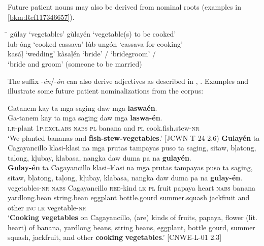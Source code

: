 Future patient nouns may also be derived from nominal roots (examples in \ref{bkm:Ref117346657}).

\ea
\label{bkm:Ref117346657}
\begin{tabbing}
\hspace{4cm} \= \kill
gúlay ‘vegetables’ \> gùlayén ‘vegetable(s) to be cooked’ \\
lub{}-óng ‘cooked cassava’ \> lùb{}-ungón ‘cassava for cooking’ \\
kasáļ ‘wedding’ \> kàsaļén ‘bride’ / ‘bridegroom’ / \\
\> ‘bride and groom’ (someone to be married)
\end{tabbing}
\z

The suffix -\textit{én}/-\textit{ón} can also derive adjectives as described in , . Examples  and  illustrate some future patient nominalizations from the corpus:

\ea
\label{bkm:Ref116398789}
Gatanem  kay  ta  mga  saging  daw  mga  \textbf{laswaén}. \\\smallskip
 \gll Ga-tanem  kay  ta  mga  saging  daw  mga  \textbf{laswa-én}. \\
\textsc{i.r}-plant  1\textsc{p.excl.abs}  \textsc{nabs}  \textsc{pl}  banana  and  \textsc{pl}  cook.fish.stew-\textsc{nr} \\
\glt ‘We planted bananas and \textbf{fish-stew-vegetables}.’ [JCWN-T-24 2.6)
\z
\ea
\label{bkm:Ref116398793}
\textbf{Gulayén}  ta  Cagayancillo  klasi-klasi  na  mga  prutas  tampayas puso  ta  saging,  sitaw,  bļatong,  taļong,  kļubay,  klabasa,  nangka  daw  duma  pa  na  \textbf{gulayén}. \\\smallskip
 \gll \textbf{Gulay-én}  ta  Cagayancillo  klasi--klasi  na  mga  prutas  tampayas puso  ta  saging,  sitaw,  bļatong,  taļong,  kļubay,  klabasa\footnotemark{},  nangka  daw  duma  pa  na  \textbf{gulay-én}. \\
vegetables-\textsc{nr}  \textsc{nabs}  Cagayancillo  \textsc{red}-kind  \textsc{lk}  \textsc{pl}  fruit  papaya heart  \textsc{nabs}  banana  yardlong.bean  string.bean  eggplant  bottle.gourd summer.squash  jackfruit  and  other  \textsc{inc}  \textsc{lk}  vegetable-\textsc{nr} \\
\glt `\textbf{Cooking} \textbf{vegetables} on Cagayancillo, (are) kinds of fruits, papaya, flower (lit. heart) of banana, yardlong beans, string beans, eggplant, bottle gourd, summer squash, jackfruit, and other \textbf{cooking} \textbf{vegetables}.’ [CNWE-L-01 2.3]
\z

